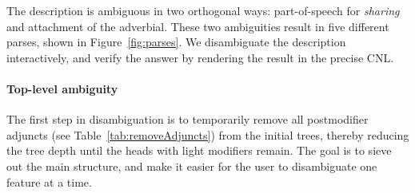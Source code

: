 \documentclass[11pt]{article}
\begin{document}
The description is ambiguous in two orthogonal ways: part-of-speech for \textit{sharing} and attachment of the adverbial.
These two ambiguities result in five different parses, shown in Figure~\ref{fig:parses}.
We disambiguate the description interactively, and
verify the answer by rendering the result in the precise CNL.



\paragraph{Top-level ambiguity} 
The first step in disambiguation is to temporarily remove all postmodifier adjuncts (see Table~\ref{tab:removeAdjuncts}) from the initial trees, thereby reducing the tree depth until the heads with light modifiers remain. The goal is to sieve out the main structure, and make it easier for the user to disambiguate one feature at a time. %

\end{document}
